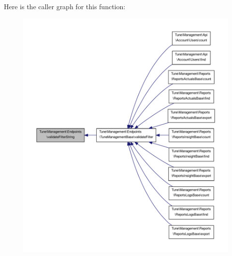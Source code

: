 Here is the caller graph for this function\-:
\nopagebreak
\begin{figure}[H]
\begin{center}
\leavevmode
\includegraphics[width=350pt]{namespaceTune_1_1Management_1_1Endpoints_a8a3f8f7bc986da92a05b19f9ca804e2d_icgraph}
\end{center}
\end{figure}


